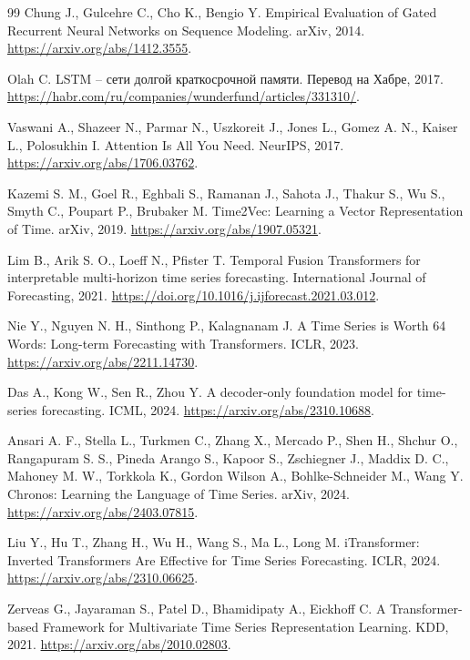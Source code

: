 \documentclass[12pt,fleqn]{article}
\begin{document}
\begin{thebibliography}{99}
Chung J., Gulcehre C., Cho K., Bengio Y.
Empirical Evaluation of Gated Recurrent Neural Networks on Sequence Modeling.
arXiv, 2014.
\url{https://arxiv.org/abs/1412.3555}.

Olah C.
LSTM -- сети долгой краткосрочной памяти.
Перевод на Хабре, 2017.
\url{https://habr.com/ru/companies/wunderfund/articles/331310/}.

Vaswani A., Shazeer N., Parmar N., Uszkoreit J., Jones L., Gomez A. N., Kaiser L., Polosukhin I.
Attention Is All You Need.
NeurIPS, 2017.
\url{https://arxiv.org/abs/1706.03762}.

Kazemi S. M., Goel R., Eghbali S., Ramanan J., Sahota J., Thakur S., Wu S., Smyth C., Poupart P., Brubaker M.
Time2Vec: Learning a Vector Representation of Time.
arXiv, 2019.
\url{https://arxiv.org/abs/1907.05321}.

Lim B., Arik S. O., Loeff N., Pfister T.
Temporal Fusion Transformers for interpretable multi-horizon time series forecasting.
International Journal of Forecasting, 2021.
\url{https://doi.org/10.1016/j.ijforecast.2021.03.012}.

Nie Y., Nguyen N. H., Sinthong P., Kalagnanam J.
A Time Series is Worth 64 Words: Long-term Forecasting with Transformers.
ICLR, 2023.
\url{https://arxiv.org/abs/2211.14730}.

Das A., Kong W., Sen R., Zhou Y.
A decoder-only foundation model for time-series forecasting.
ICML, 2024.
\url{https://arxiv.org/abs/2310.10688}.

Ansari A. F., Stella L., Turkmen C., Zhang X., Mercado P., Shen H., Shchur O., Rangapuram S. S., Pineda Arango S., Kapoor S., Zschiegner J., Maddix D. C., Mahoney M. W., Torkkola K., Gordon Wilson A., Bohlke-Schneider M., Wang Y.
Chronos: Learning the Language of Time Series.
arXiv, 2024.
\url{https://arxiv.org/abs/2403.07815}.

Liu Y., Hu T., Zhang H., Wu H., Wang S., Ma L., Long M.
iTransformer: Inverted Transformers Are Effective for Time Series Forecasting.
ICLR, 2024.
\url{https://arxiv.org/abs/2310.06625}.

Zerveas G., Jayaraman S., Patel D., Bhamidipaty A., Eickhoff C.
A Transformer-based Framework for Multivariate Time Series Representation Learning.
KDD, 2021.
\url{https://arxiv.org/abs/2010.02803}.


\end{thebibliography}
\end{document}
